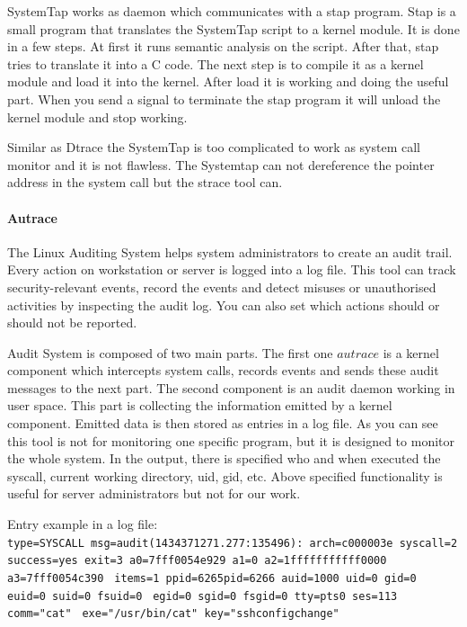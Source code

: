 SystemTap works as daemon which communicates with a stap program.
Stap is a small program that translates the SystemTap script to a kernel module.
It is done in a few steps.
At first it runs semantic analysis on the script.
After that, stap tries to translate it into a C code.
The next step is to compile it as a kernel module and load it into the kernel.
After load it is working and doing the useful part.
When you send a signal to terminate the stap program it will unload the kernel module and stop working.

Similar as Dtrace the SystemTap is too complicated to work as system call monitor and it is not flawless.
The Systemtap can not dereference the pointer address in the system call but the strace tool can.


\paragraph{Autrace}
The Linux Auditing System helps system administrators to create an audit trail.
Every action on workstation or server is logged into a log file.
This tool can track security-relevant events, record the events and detect misuses or unauthorised activities by inspecting the audit log.
You can also set which actions should or should not be reported.

Audit System is composed of two main parts.
The first one \(autrace\) is a kernel component which intercepts system calls, records events and sends these audit messages to the next part.
The second component is an audit daemon working in user space.
This part is collecting the information emitted by a kernel component.
Emitted data is then stored as entries in a log file.
As you can see this tool is not for monitoring one specific program, but it is designed to monitor the whole system.
In the output, there is specified who and when executed the syscall, current working directory, uid, gid, etc.
Above specified functionality is useful for server administrators but not for our work.

Entry example in a log file:\\
\noindent
\texttt{type=SYSCALL msg=audit(1434371271.277:135496): arch=c000003e syscall=2}\linebreak
\texttt{success=yes exit=3 a0=7fff0054e929 a1=0 a2=1fffffffffff0000 a3=7fff0054c390 }\linebreak
\texttt{items=1 ppid=6265pid=6266 auid=1000 uid=0 gid=0 euid=0 suid=0 fsuid=0 }\linebreak
\texttt{egid=0 sgid=0 fsgid=0 tty=pts0 ses=113 comm="cat" }\linebreak
\texttt{exe="/usr/bin/cat" key="sshconfigchange"}


